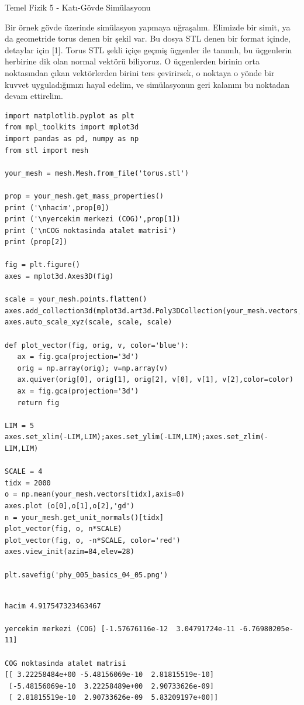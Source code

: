 \documentclass[12pt,fleqn]{article}\usepackage{../../common}
\begin{document}
Temel Fizik 5 - Katı-Gövde Simülasyonu

Bir örnek gövde üzerinde simülasyon yapmaya uğraşalım. Elimizde bir simit, ya da
geometride torus denen bir şekil var. Bu dosya STL denen bir format içinde,
detaylar için [1]. Torus STL şekli içiçe geçmiş üçgenler ile tanımlı, bu
üçgenlerin herbirine dik olan normal vektörü biliyoruz. O üçgenlerden birinin
orta noktasından çıkan vektörlerden birini ters çevirirsek, o noktaya o yönde
bir kuvvet uyguladığımızı hayal edelim, ve simülasyonun geri kalanını bu
noktadan devam ettirelim.

\begin{verbatim}
import matplotlib.pyplot as plt
from mpl_toolkits import mplot3d
import pandas as pd, numpy as np
from stl import mesh

your_mesh = mesh.Mesh.from_file('torus.stl')

prop = your_mesh.get_mass_properties()
print ('\nhacim',prop[0])
print ('\nyercekim merkezi (COG)',prop[1])
print ('\nCOG noktasinda atalet matrisi')
print (prop[2])

fig = plt.figure()
axes = mplot3d.Axes3D(fig)

scale = your_mesh.points.flatten()
axes.add_collection3d(mplot3d.art3d.Poly3DCollection(your_mesh.vectors,alpha=0.3))
axes.auto_scale_xyz(scale, scale, scale)

def plot_vector(fig, orig, v, color='blue'):
   ax = fig.gca(projection='3d')
   orig = np.array(orig); v=np.array(v)
   ax.quiver(orig[0], orig[1], orig[2], v[0], v[1], v[2],color=color)
   ax = fig.gca(projection='3d')  
   return fig

LIM = 5
axes.set_xlim(-LIM,LIM);axes.set_ylim(-LIM,LIM);axes.set_zlim(-LIM,LIM)

SCALE = 4
tidx = 2000
o = np.mean(your_mesh.vectors[tidx],axis=0)
axes.plot (o[0],o[1],o[2],'gd')
n = your_mesh.get_unit_normals()[tidx]
plot_vector(fig, o, n*SCALE)
plot_vector(fig, o, -n*SCALE, color='red')
axes.view_init(azim=84,elev=28)

plt.savefig('phy_005_basics_04_05.png')
\end{verbatim}

\begin{verbatim}

hacim 4.917547323463467

yercekim merkezi (COG) [-1.57676116e-12  3.04791724e-11 -6.76980205e-11]

COG noktasinda atalet matrisi
[[ 3.22258484e+00 -5.48156069e-10  2.81815519e-10]
 [-5.48156069e-10  3.22258489e+00  2.90733626e-09]
 [ 2.81815519e-10  2.90733626e-09  5.83209197e+00]]
\end{verbatim}
\end{document}
